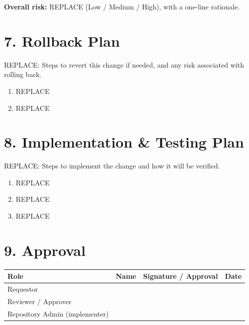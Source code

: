 \documentclass[11pt]{article}
\begin{document}
\noindent \textbf{Overall risk:} REPLACE (Low / Medium / High), with a one-line rationale.

\section*{7. Rollback Plan}

REPLACE: Steps to revert this change if needed, and any risk associated with rolling back.

\begin{enumerate}[label=\arabic*.]
    \item REPLACE
    \item REPLACE
\end{enumerate}

\section*{8. Implementation \& Testing Plan}

REPLACE: Steps to implement the change and how it will be verified.

\begin{enumerate}[label=\arabic*.]
    \item REPLACE
    \item REPLACE
    \item REPLACE
\end{enumerate}

\section*{9. Approval}

\begin{longtable}{|p{4cm}|p{3.5cm}|p{4cm}|p{2.5cm}|}
\hline
\textbf{Role} & \textbf{Name} & \textbf{Signature / Approval} & \textbf{Date} \\
\hline
Requestor & & & \\
\hline
Reviewer / Approver & & & \\
\hline
Repository Admin (implementer) & & & \\
\hline
\end{longtable}
\end{document}
